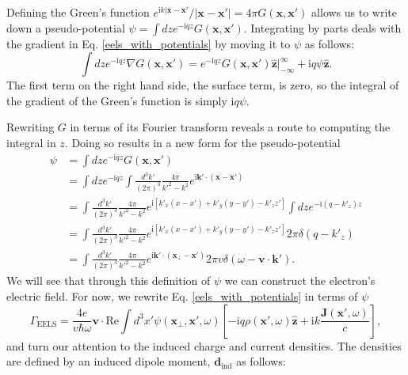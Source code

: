 \documentclass [11pt, proquest] {uwthesis}[2016/11/22]
\begin{document}
Defining the Green's function $e^{\textrm{i}k|\textbf{x}-\textbf{x}'}/|\textbf{x}-\textbf{x}'| = 4\pi G(\textbf{x},\textbf{x}')$ allows us to write down a pseudo-potential $\psi = \int dz e^{-\textrm{i}qz} G(\textbf{x},\textbf{x}')$. Integrating by parts deals with the gradient in Eq. \ref{eels_with_potentials} by moving it to $\psi$ as follows: 
\begin{equation}
\int dz e^{-\textrm{i}qz} \nabla G(\textbf{x},\textbf{x}') = e^{-\textrm{i}qz} G(\textbf{x},\textbf{x}') \hat{\textbf{z}} \Big|_{-\infty}^{\infty} + \textrm{i}q \psi \hat{\textbf{z}}.
\label{psi_integral}
\end{equation}
The first term on the right hand side, the surface term, is zero, so the integral of the gradient of the Green's function is simply $\textrm{i}q\psi$.

Rewriting $G$ in terms of its Fourier transform reveals a route to computing the integral in $z$. Doing so results in a new form for the pseudo-potential
\begin{equation}
\begin{aligned}
\psi &= \int dz e^{-\textrm{i}qz} G(\textbf{x},\textbf{x}')\\ 
&= \int dz e^{-\textrm{i}qz} \int \frac{d^3k'}{(2\pi)^3} \frac{4\pi}{k'^2 - k^2} e^{\textrm{i}\textbf{k}'\cdot(\textbf{x}-\textbf{x}')}\\
&= \int \frac{d^3k'}{(2\pi)^3} \frac{4\pi}{k'^2 - k^2} e^{\textrm{i}[k'_x(x-x')+k'_y(y-y')-k'_zz']} \int dz e^{-\textrm{i}(q-k'_z)z}\\
&= \int \frac{d^3k'}{(2\pi)^3} \frac{4\pi}{k'^2 - k^2} e^{\textrm{i}[k'_x(x-x')+k'_y(y-y')-k'_zz']} 2\pi\delta(q-k'_z)\\
&= \int \frac{d^3k'}{(2\pi)^3} \frac{4\pi}{k'^2 - k^2} e^{\textrm{i}\textbf{k}'\cdot(\textbf{x}_{\perp}-\textbf{x}')} 2\pi v \delta(\omega-\textbf{v}\cdot\textbf{k}').
\label{psi_k_space}
\end{aligned}
\end{equation}
We will see that through this definition of $\psi$ we can construct the electron's electric field. For now, we rewrite Eq. \ref{eels_with_potentials} in terms of $\psi$
\begin{equation}
\Gamma_{\textrm{EELS}} = \frac{4e}{v\hbar\omega}\textbf{v}\cdot\textrm{Re}\int d^3x' \psi(\textbf{x}_{\perp},\textbf{x}',\omega) \left[-\textrm{i}q\rho(\textbf{x}',\omega)\hat{\textbf{z}} + \textrm{i}k\frac{\textbf{J}(\textbf{x}',\omega)}{c}\right],
\label{eels_with_psi}
\end{equation}
and turn our attention to the induced charge and current densities. The densities are defined by an induced dipole moment, $\textbf{d}_{\textrm{ind}}$ as follows:
\end{document}
